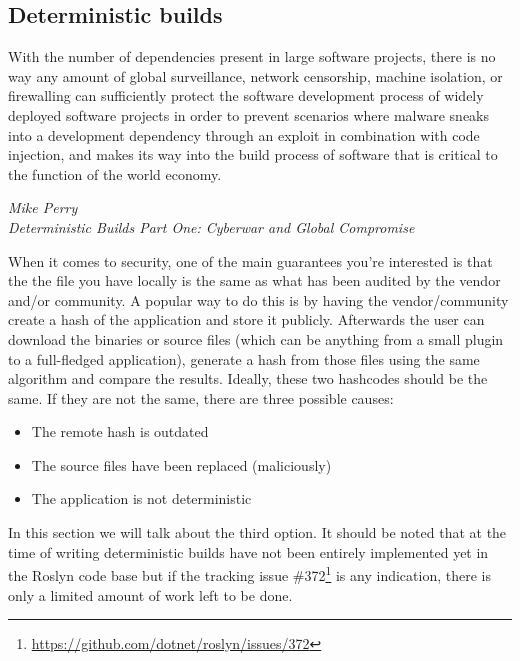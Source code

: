 \subsection{Deterministic builds}
\label{sec:deterministic-builds}

\epigraph{With the number of dependencies present in large software projects, there is no way any amount of global surveillance, network censorship, machine isolation, or firewalling can sufficiently protect the software development process of widely deployed software projects in order to prevent scenarios where \gls{malware} sneaks into a development dependency through an exploit in combination with code injection, and makes its way into the build process of software that is critical to the function of the world economy.}
{\textit{Mike Perry \\ \footnotesize{Deterministic Builds Part One: Cyberwar and Global Compromise\protect\footnotemark}}}


When it comes to security, one of the main guarantees you're interested is that the the file you have locally is the same as what has been audited by the vendor and/or community. A popular way to do this is by having the vendor/community create a hash of the application and store it publicly. Afterwards the user can download the binaries or source files (which can be anything from a small plugin to a full-fledged application), generate a hash from those files using the same algorithm and compare the results. Ideally, these two hashcodes should be the same. If they are not the same, there are three possible causes:

\begin{itemize}
\item The remote hash is outdated
\item The source files have been replaced (maliciously)
\item The application is not deterministic
\end{itemize}

In this section we will talk about the third option. It should be noted that at the time of writing deterministic builds have not been entirely implemented yet in the Roslyn code base but if the tracking issue \#372\footnote{\url{https://github.com/dotnet/roslyn/issues/372}} is any indication, there is only a limited amount of work left to be done.

